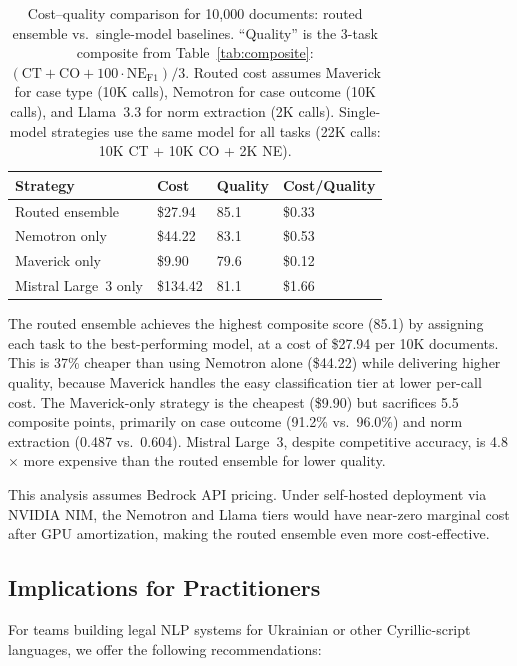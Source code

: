 \documentclass[11pt,a4paper]{article}
\begin{document}
\begin{table}[t]
\centering
\caption{Cost--quality comparison for 10,000 documents: routed ensemble vs.\ single-model baselines. ``Quality'' is the 3-task composite from Table~\ref{tab:composite}: $(\text{CT} + \text{CO} + 100 \cdot \text{NE}_{\text{F1}}) / 3$. Routed cost assumes Maverick for case type (10K calls), Nemotron for case outcome (10K calls), and Llama~3.3 for norm extraction (2K calls). Single-model strategies use the same model for all tasks (22K calls: 10K CT + 10K CO + 2K NE).}
\label{tab:routing}
\small
\begin{tabular}{lR{2.0cm}R{2.0cm}R{2.0cm}}
\toprule
\textbf{Strategy} & \textbf{Cost} & \textbf{Quality} & \textbf{Cost/Quality} \\
\midrule
Routed ensemble         & \$27.94  & 85.1 & \$0.33 \\
Nemotron only           & \$44.22  & 83.1 & \$0.53 \\
Maverick only           & \$9.90   & 79.6 & \$0.12 \\
Mistral Large~3 only    & \$134.42 & 81.1 & \$1.66 \\
\bottomrule
\end{tabular}
\end{table}

The routed ensemble achieves the highest composite score (85.1) by assigning each task to the best-performing model, at a cost of \$27.94 per 10K documents. This is 37\% cheaper than using Nemotron alone (\$44.22) while delivering higher quality, because Maverick handles the easy classification tier at lower per-call cost. The Maverick-only strategy is the cheapest (\$9.90) but sacrifices 5.5 composite points, primarily on case outcome (91.2\% vs.\ 96.0\%) and norm extraction (0.487 vs.\ 0.604). Mistral Large~3, despite competitive accuracy, is 4.8$\times$ more expensive than the routed ensemble for lower quality.

This analysis assumes Bedrock API pricing. Under self-hosted deployment via NVIDIA NIM, the Nemotron and Llama tiers would have near-zero marginal cost after GPU amortization, making the routed ensemble even more cost-effective.

\subsection{Implications for Practitioners}

For teams building legal NLP systems for Ukrainian or other Cyrillic-script languages, we offer the following recommendations:
\end{document}
